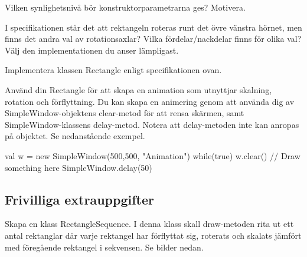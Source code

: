 \Subtask Vilken synlighetsnivå bör konstruktorparametrarna ges? Motivera.

\Subtask I specifikationen står det att rektangeln roteras runt det övre vänstra hörnet, men finns det andra val av rotationsaxlar? Vilka fördelar/nackdelar finns för olika val?
Välj den implementationen du anser lämpligast.

\Subtask Implementera klassen Rectangle enligt specifikationen ovan.

\Subtask Använd din Rectangle för att skapa en animation som utnyttjar skalning, rotation och förflyttning.
Du kan skapa en animering genom att använda dig av SimpleWindow-objektens clear-metod för att rensa skärmen, samt SimpleWindow-klassens delay-metod.
Notera att delay-metoden inte kan anropas på objektet. Se nedanstående exempel.

\begin{Code}
val w = new SimpleWindow(500,500, "Animation")
while(true){
	w.clear()
	// Draw something here
	SimpleWindow.delay(50)
}
\end{Code}




\subsection{Frivilliga extrauppgifter}


\Task Skapa en klass RectangleSequence. I denna klass skall draw-metoden rita ut ett antal rektanglar där varje rektangel har förflyttat sig, roterats och skalats jämfört med föregående rektangel i sekvensen. Se bilder nedan.


